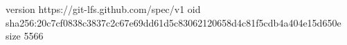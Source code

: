 version https://git-lfs.github.com/spec/v1
oid sha256:20c7cf0838c3837c2c67e69dd61d5c83062120658d4c81f5cdb4a404e15d650e
size 5566
